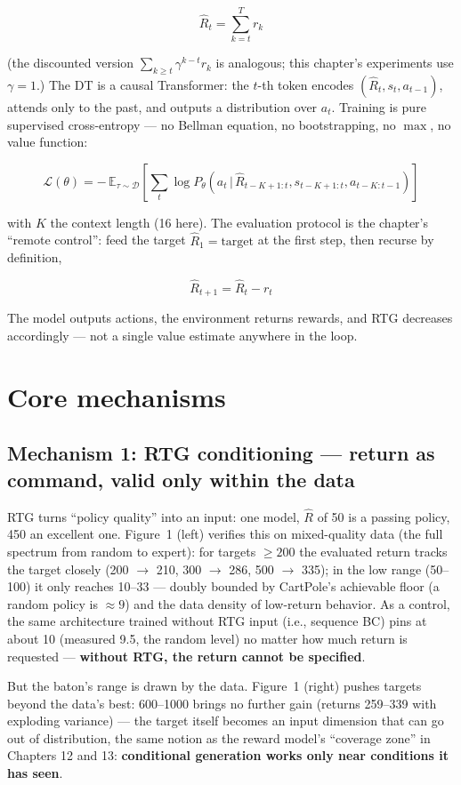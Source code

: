 \documentclass{article}
\begin{document}
\[
\hat{R}_t = \sum_{k=t}^{T} r_k
\]

(the discounted version $\sum_{k\ge t}\gamma^{k-t}r_k$ is analogous; this chapter's experiments use $\gamma=1$.) The DT is a causal Transformer: the $t$-th token encodes $(\hat{R}_t, s_t, a_{t-1})$, attends only to the past, and outputs a distribution over $a_t$. Training is pure supervised cross-entropy --- no Bellman equation, no bootstrapping, no $\max$, no value function:

\[
\mathcal{L}(\theta) = -\,\mathbb{E}_{\tau \sim \mathcal{D}}\left[\sum_t \log P_\theta\!\left(a_t \,\Big|\, \hat{R}_{t-K+1:t}, s_{t-K+1:t}, a_{t-K:t-1}\right)\right]
\]

with $K$ the context length (16 here). The evaluation protocol is the chapter's ``remote control'': feed the target $\hat{R}_1 = \text{target}$ at the first step, then recurse by definition,

\[
\hat{R}_{t+1} = \hat{R}_t - r_t
\]

The model outputs actions, the environment returns rewards, and RTG decreases accordingly --- not a single value estimate anywhere in the loop.

\section*{Core mechanisms}

\subsection*{Mechanism 1: RTG conditioning --- return as command, valid only within the data}

RTG turns ``policy quality'' into an input: one model, $\hat R$ of 50 is a passing policy, 450 an excellent one. Figure~1 (left) verifies this on mixed-quality data (the full spectrum from random to expert): for targets $\ge 200$ the evaluated return tracks the target closely (200 $\to$ 210, 300 $\to$ 286, 500 $\to$ 335); in the low range (50--100) it only reaches 10--33 --- doubly bounded by CartPole's achievable floor (a random policy is $\approx 9$) and the data density of low-return behavior. As a control, the same architecture trained without RTG input (i.e., sequence BC) pins at about 10 (measured 9.5, the random level) no matter how much return is requested --- \textbf{without RTG, the return cannot be specified}.

But the baton's range is drawn by the data. Figure~1 (right) pushes targets beyond the data's best: 600--1000 brings no further gain (returns 259--339 with exploding variance) --- the target itself becomes an input dimension that can go out of distribution, the same notion as the reward model's ``coverage zone'' in Chapters 12 and 13: \textbf{conditional generation works only near conditions it has seen}.
\end{document}
